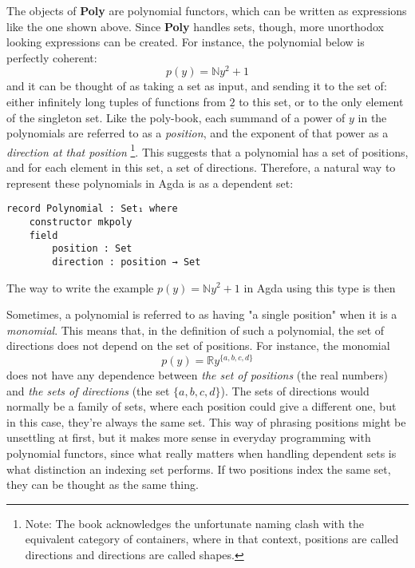 The objects of \textbf{Poly} are polynomial functors, which can be written as expressions like the one shown above. Since \textbf{Poly} handles sets, though, more unorthodox looking expressions can be created. For instance, the polynomial below is perfectly coherent:
\begin{equation}
p(y) = \mathbb{N}y^2 + 1
\label{eqn.natpoly}
\end{equation}
and it can be thought of as taking a set as input, and sending it to the set of: either infinitely long tuples of functions from $\underline{2}$ to this set, or to the only element of the singleton set. Like the poly-book, each summand of a power of $y$ in the polynomials are referred to as a \textit{position}, and the exponent of that power as a \textit{direction at that position}
\footnote{Note: The book acknowledges the unfortunate naming clash with the equivalent category of containers, where in that context, positions are called directions and directions are called shapes.}.
This suggests that a polynomial has a set of positions, and for each element in this set, a set of directions. Therefore, a natural way to represent these polynomials in Agda is as a dependent set:

\begin{verbatim}
record Polynomial : Set₁ where
    constructor mkpoly
    field
        position : Set
        direction : position → Set
\end{verbatim}
The way to write the example $p(y) = \mathbb{N}y^2 + 1$ in Agda using this type is then

Sometimes, a polynomial is referred to as having "a single position" when it is a \textit{monomial}.
This means that, in the definition of such a polynomial, the set of directions does not depend on the set of positions.
For instance, the monomial
$$
p(y) = \mathbb{R}y^{\{a, b, c, d\}}
$$
does not have any dependence between \textit{the set of positions} (the real numbers) and \textit{the sets of directions} (the set $\{a, b, c, d\}$).
The sets of directions would normally be a family of sets, where each position could give a different one, but in this case, they're always the same set.
This way of phrasing positions might be unsettling at first, but it makes more sense in everyday programming with polynomial functors, since what really matters when handling dependent sets is what distinction an indexing set performs. 
If two positions index the same set, they can be thought as the same thing.

